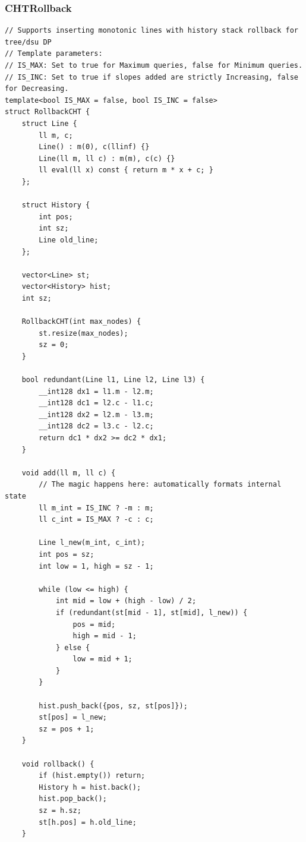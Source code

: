 \documentclass[9pt,a4paper,twocolumn]{extarticle}
\begin{document}
\subsubsection{CHTRollback}
\nopagebreak
\begin{lstlisting}
// Supports inserting monotonic lines with history stack rollback for tree/dsu DP
// Template parameters:
// IS_MAX: Set to true for Maximum queries, false for Minimum queries.
// IS_INC: Set to true if slopes added are strictly Increasing, false for Decreasing.
template<bool IS_MAX = false, bool IS_INC = false>
struct RollbackCHT {
    struct Line {
        ll m, c;
        Line() : m(0), c(llinf) {}
        Line(ll m, ll c) : m(m), c(c) {}
        ll eval(ll x) const { return m * x + c; }
    };

    struct History {
        int pos;
        int sz;
        Line old_line;
    };

    vector<Line> st;
    vector<History> hist;
    int sz;

    RollbackCHT(int max_nodes) {
        st.resize(max_nodes);
        sz = 0;
    }

    bool redundant(Line l1, Line l2, Line l3) {
        __int128 dx1 = l1.m - l2.m;
        __int128 dc1 = l2.c - l1.c;
        __int128 dx2 = l2.m - l3.m;
        __int128 dc2 = l3.c - l2.c;
        return dc1 * dx2 >= dc2 * dx1;
    }

    void add(ll m, ll c) {
        // The magic happens here: automatically formats internal state
        ll m_int = IS_INC ? -m : m;
        ll c_int = IS_MAX ? -c : c;

        Line l_new(m_int, c_int);
        int pos = sz;
        int low = 1, high = sz - 1;

        while (low <= high) {
            int mid = low + (high - low) / 2;
            if (redundant(st[mid - 1], st[mid], l_new)) {
                pos = mid;
                high = mid - 1;
            } else {
                low = mid + 1;
            }
        }

        hist.push_back({pos, sz, st[pos]});
        st[pos] = l_new;
        sz = pos + 1;
    }

    void rollback() {
        if (hist.empty()) return;
        History h = hist.back();
        hist.pop_back();
        sz = h.sz;
        st[h.pos] = h.old_line;
    }


\end{lstlisting}
\end{document}
